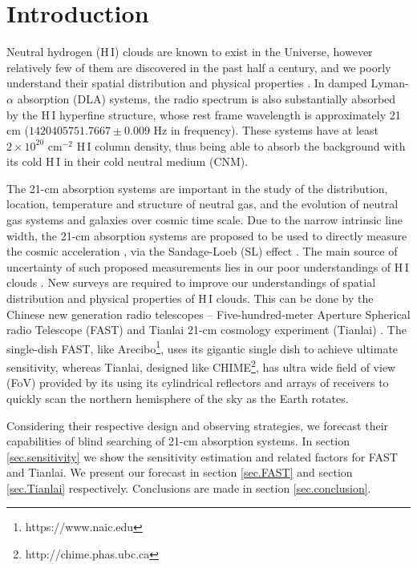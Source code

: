 \documentclass[]{raa}
\newcommand{\HI}{{H{\small\,I}}}
\begin{document}
\maketitle

\section{Introduction}\label{sec.introduction}
Neutral hydrogen (\HI) clouds are known to exist in the Universe,
however relatively few of them are discovered in the past half a century,
and we poorly understand their spatial distribution and physical
properties \citep{2005ARA&A..43..861W}. 
In damped Lyman-$\alpha$ absorption (DLA)
systems, the radio spectrum is also substantially absorbed by the {\HI}
hyperfine structure, whose rest frame wavelength is approximately 21 cm
($1420405751.7667\pm 0.009$ Hz in frequency). These systems have
at least $2\times 10^{20}$ cm$^{-2}$ {\HI} column density, thus being
able to absorb the background with its cold {\HI} in their cold neutral medium (CNM).

The 21-cm absorption systems are important in the study of the 
distribution, location, temperature and structure of neutral gas,
and the evolution of neutral gas systems and galaxies over
cosmic time scale.
Due to the narrow intrinsic line width, the 21-cm absorption systems
are proposed to be used to directly measure the cosmic acceleration
\citep{2012ApJ...761L..26D,2014PhRvL.113d1303Y}, via the 
Sandage-Loeb (SL) effect \citep{1962ApJ...136..319S,1998ApJ...499L.111L}.
The main source of uncertainty of such proposed measurements lies in our
poor understandings of {\HI} clouds \citep{2014PhRvL.113d1303Y}.
New surveys are required
to improve our understandings of spatial distribution and physical
properties of {\HI} clouds.
This can be done by the Chinese new generation radio telescopes --
Five-hundred-meter Aperture Spherical radio Telescope (FAST)
\citep{2016RaSc...51.1060L} and Tianlai 21-cm cosmology experiment
(Tianlai) \citep{2012IJMPS..12..256C}.
The single-dish FAST, like Arecibo\footnote{https://www.naic.edu},
uses its gigantic single dish to achieve ultimate sensitivity, whereas
Tianlai, designed like CHIME\footnote{http://chime.phas.ubc.ca},
has ultra wide field of view (FoV) provided by its
using its cylindrical reflectors and arrays of receivers to
quickly scan the northern hemisphere of the sky as the Earth rotates.

Considering their respective design and observing strategies,
we forecast their capabilities of blind searching of 21-cm absorption
systems. In section \ref{sec.sensitivity} we show the sensitivity
estimation and related factors for FAST and Tianlai.
We present our forecast in section \ref{sec.FAST}
and section \ref{sec.Tianlai} respectively.
Conclusions are made in section \ref{sec.conclusion}.
\end{document}
